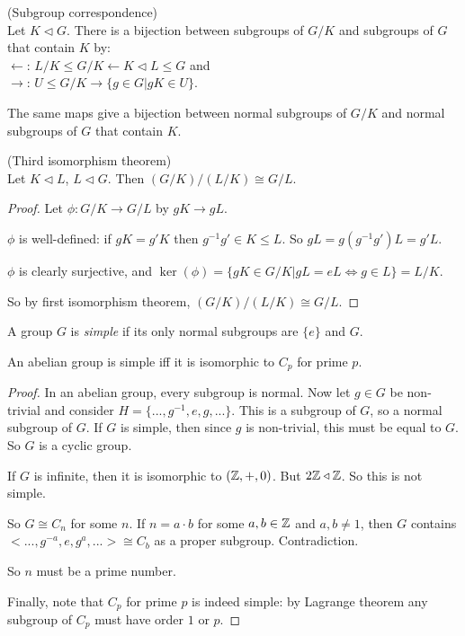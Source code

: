 \documentclass[a4paper]{article}
\begin{document}
\begin{thm} (Subgroup correspondence)\\
Let $K \triangleleft G$. There is a bijection between subgroups of $G/K$ and subgroups of $G$ that contain $K$ by:\\
$\leftarrow$: $L/K \leq G/K \leftarrow K \triangleleft L \leq G $ and\\
$\rightarrow$: $U \leq G/K \to \{g \in G| gK \in U\}$.

The same maps give a bijection between normal subgroups of $G/K$ and normal subgroups of $G$ that contain $K$.
\end{thm}

\begin{thm} (Third isomorphism theorem)\\
Let $K \triangleleft L$, $L \triangleleft G$. Then $(G/K)/(L/K) \cong G/L$.
\begin{proof}
Let $\phi:G/K \to G/L$ by $gK \to gL$.

$\phi$ is well-defined: if $gK=g'K$ then $g^{-1}g' \in K \leq L$. So $gL =g(g^{-1}g')L = g'L$.

$\phi$ is clearly surjective, and $\ker(\phi) = \{gK \in G/K | gL=eL \iff g\in L\} = L/K$.

So by first isomorphism theorem, $(G/K)/(L/K) \cong G/L$.
\end{proof}
\end{thm}

\begin{defi}
A group $G$ is \emph{simple} if its only normal subgroups are $\{e\}$ and $G$.

\begin{lemma}
An abelian group is simple iff it is isomorphic to $C_p$ for prime $p$.
\begin{proof}
In an abelian group, every subgroup is normal. Now let $g \in G$ be non-trivial and consider $H=\{...,g^{-1},e,g,...\}$. This is a subgroup of $G$, so a normal subgroup of $G$. If $G$ is simple, then since $g$ is non-trivial, this must be equal to $G$. So $G$ is a cyclic group.

If $G$ is infinite, then it is isomorphic to $(\mathbb{Z},+,0)$. But $2\mathbb{Z} \triangleleft \mathbb{Z}$. So this is not simple.

So $G \cong C_n$ for some $n$. If $n = a\cdot b$ for some $a,b \in \mathbb{Z}$ and $a,b \neq 1$, then $G$ contains $<...,g^{-a},e,g^a,...> \cong C_b$ as a proper subgroup. Contradiction.

So $n$ must be a prime number.

Finally, note that $C_p$ for prime $p$ is indeed simple: by Lagrange theorem any subgroup of $C_p$ must have order $1$ or $p$.
\end{proof}
\end{lemma}
\end{defi}
\end{document}
